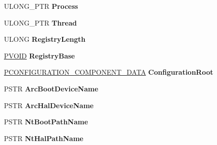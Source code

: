 \begin{DoxyCompactItemize}
U\+L\+O\+N\+G\+\_\+\+P\+TR {\bfseries Process}
\item 
\mbox{\label{struct___l_o_a_d_e_r___p_a_r_a_m_e_t_e_r___b_l_o_c_k_ac124191622141a1d0d04e6acebe63b38}} 
U\+L\+O\+N\+G\+\_\+\+P\+TR {\bfseries Thread}
\item 
\mbox{\label{struct___l_o_a_d_e_r___p_a_r_a_m_e_t_e_r___b_l_o_c_k_ad9a745120a480eef2f4a50d78c645ca1}} 
U\+L\+O\+NG {\bfseries Registry\+Length}
\item 
\mbox{\label{struct___l_o_a_d_e_r___p_a_r_a_m_e_t_e_r___b_l_o_c_k_aaf34bfd70616b459efb2fc618e3f660f}} 
\hyperlink{interfacevoid}{P\+V\+O\+ID} {\bfseries Registry\+Base}
\item 
\mbox{\label{struct___l_o_a_d_e_r___p_a_r_a_m_e_t_e_r___b_l_o_c_k_a371ea62fd9efc89adf5be60687b32857}} 
\hyperlink{struct___c_o_n_f_i_g_u_r_a_t_i_o_n___c_o_m_p_o_n_e_n_t___d_a_t_a}{P\+C\+O\+N\+F\+I\+G\+U\+R\+A\+T\+I\+O\+N\+\_\+\+C\+O\+M\+P\+O\+N\+E\+N\+T\+\_\+\+D\+A\+TA} {\bfseries Configuration\+Root}
\item 
\mbox{\label{struct___l_o_a_d_e_r___p_a_r_a_m_e_t_e_r___b_l_o_c_k_abd3d1861bc76b2a95e8ce5ca481b0b51}} 
P\+S\+TR {\bfseries Arc\+Boot\+Device\+Name}
\item 
\mbox{\label{struct___l_o_a_d_e_r___p_a_r_a_m_e_t_e_r___b_l_o_c_k_a169f19e181c3fd70e376ff16e625a604}} 
P\+S\+TR {\bfseries Arc\+Hal\+Device\+Name}
\item 
\mbox{\label{struct___l_o_a_d_e_r___p_a_r_a_m_e_t_e_r___b_l_o_c_k_ac83315556babec8d9a3fa1023e112209}} 
P\+S\+TR {\bfseries Nt\+Boot\+Path\+Name}
\item 
\mbox{\label{struct___l_o_a_d_e_r___p_a_r_a_m_e_t_e_r___b_l_o_c_k_ad5475d5a1a88037725a70838eb401af4}} 
P\+S\+TR {\bfseries Nt\+Hal\+Path\+Name}
\item 

\end{DoxyCompactItemize}
